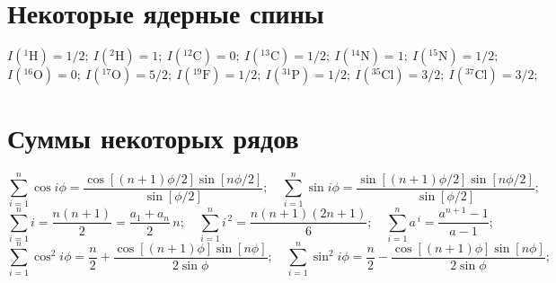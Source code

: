 \vspace{0.5cm}

\section{Некоторые ядерные спины}
\[I(^1\text{H})=1/2;\ I(^2\text{H})= 1;\ I(^{12}\text{C})=0;\ I(^{13}\text{C})=1/2;\ I(^{14}\text{N})=1;\ I(^{15}\text{N})=1/2;\ \] \vspace{0.1mm}
\[I(^{16}\text{O})=0;\ I(^{17}\text{O})=5/2;\ I(^{19}\text{F})=1/2;\ I(^{31}\text{P})=1/2;\ I(^{35}\text{Cl})=3/2;\ I(^{37}\text{Cl})=3/2; \]

\vspace{0.5cm}

\section{Суммы некоторых рядов}
\[ \sum\limits_{i=1}^{n} \cos{i\phi} = \dfrac{\cos\left[{(n+1)\phi/2}\right]\sin[n\phi/2]}{\sin{[\phi/2]}};\quad
\sum\limits_{i=1}^{n} \sin{i\phi} = \dfrac{\sin\left[{(n+1)\phi/2}\right]\sin[n\phi/2]}{\sin{[\phi/2]}};\] \vspace{0.1mm}
\[ \sum\limits_{i=1}^{n} i = \dfrac{n(n+1)}{2}= \dfrac{a_1+a_n}{2}\,n;\quad 
 \sum\limits_{i=1}^{n} i^{\,2} = \dfrac{n(n+1)(2n+1)}{6};\quad
 \sum\limits_{i=1}^{n} a^{\,i} = \dfrac{a^{n+1}-1}{a-1};\] \vspace{1.5mm}
 \[ \sum\limits_{i=1}^{n} \cos^2{i\phi} = \dfrac{n}{2}+\dfrac{\cos\left[{(n+1)\phi}\right]\sin[n\phi]}{2\sin{\phi}};\quad
\sum\limits_{i=1}^{n} \sin^2{i\phi} = \dfrac{n}{2}-\dfrac{\cos\left[{(n+1)\phi}\right]\sin[n\phi]}{2\sin{\phi}};\] \vspace{0.1mm}

